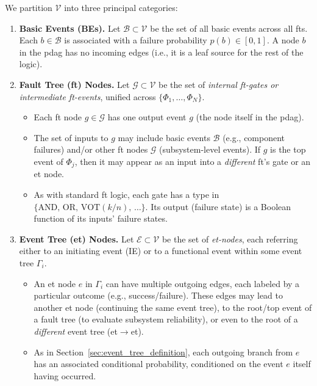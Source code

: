 We partition \(\mathcal{V}\) into three principal categories:
\begin{enumerate}
\item \textbf{Basic Events (BEs).}  Let \(\mathcal{B}\subset \mathcal{V}\) be the set of all basic events across all \acrshort{ft}s.  Each \(b\in\mathcal{B}\) is associated with a failure probability \(p(b)\in [0,1]\).  A node \(b\) in the \acrshort{pdag} has no incoming edges (i.e., it is a leaf source for the rest of the logic).  

\item \textbf{Fault Tree (\acrshort{ft}) Nodes.}  Let \(\mathcal{G}\subset \mathcal{V}\) be the set of \emph{internal \acrshort{ft}-gates or intermediate \acrshort{ft}-events}, unified across \(\{\Phi_1,\dots,\Phi_N\}\).  
    \begin{itemize}
    \item Each \acrshort{ft} node \(g\in \mathcal{G}\) has one output event \(g\) (the node itself in the \acrshort{pdag}).  
    \item The set of inputs to \(g\) may include basic events \(\mathcal{B}\) (e.g., component failures) and/or other \acrshort{ft} nodes \(\mathcal{G}\) (subsystem-level events). If \(g\) is the top event of \(\Phi_j\), then it may appear as an input into a \emph{different} \acrshort{ft}'s gate or an \acrshort{et} node.  
    \item As with standard \acrshort{ft} logic, each gate has a type in \(\{\mathrm{AND},\,\mathrm{OR},\,\mathrm{VOT}(k/n),\,\ldots\}\).  Its output (failure state) is a Boolean function of its inputs' failure states.
    \end{itemize}

\item \textbf{Event Tree (\acrshort{et}) Nodes.}  Let \(\mathcal{E}\subset \mathcal{V}\) be the set of \emph{\acrshort{et}-nodes}, each referring either to an initiating event (IE) or to a functional event within some event tree \(\Gamma_i\).  
    \begin{itemize}
    \item An \acrshort{et} node \(e\) in \(\Gamma_i\) can have multiple outgoing edges, each labeled by a particular outcome (e.g., success/failure).  These edges may lead to another \acrshort{et} node (continuing the same event tree), to the root/top event of a fault tree (to evaluate subsystem reliability), or even to the root of a \emph{different} event tree (\acrshort{et}\(\to\)\acrshort{et}).
    \item As in Section~\ref{sec:event_tree_definition}, each outgoing branch from \(e\) has an associated conditional probability, conditioned on the event \(e\) itself having occurred.  
    \end{itemize}
\end{enumerate}

